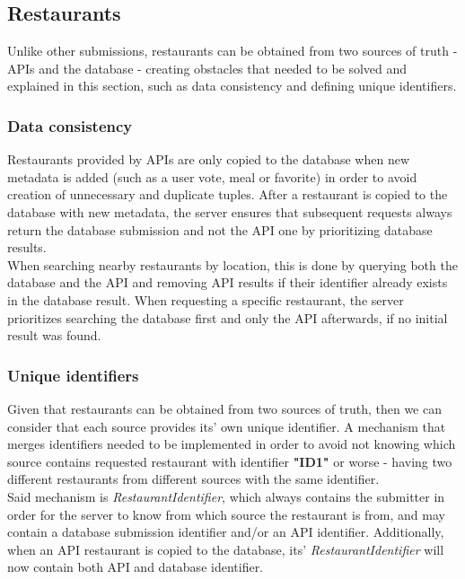 \subsection{Restaurants}

Unlike other submissions, restaurants can be obtained from two sources of truth - APIs and the database -
creating obstacles that needed to be solved and explained in this section, such as data consistency and defining unique identifiers.\\

\subsubsection{Data consistency}

Restaurants provided by APIs are only copied to the database when new metadata is added (such as a user vote, meal or favorite) in order
to avoid creation of unnecessary and duplicate tuples. After a restaurant is copied to the database with new metadata, the server ensures
that subsequent requests always return the database submission and not the API one by prioritizing database results.\\

When searching nearby restaurants by location, this is done by querying both the database and the API and removing API results if their
identifier already exists in the database result. When requesting a specific restaurant, the server prioritizes searching the database
first and only the API afterwards, if no initial result was found.\\

\subsubsection{Unique identifiers}

Given that restaurants can be obtained from two sources of truth, then we can consider that each source provides its' own unique identifier.
A mechanism that merges identifiers needed to be implemented in order to avoid not knowing which source contains requested restaurant with
identifier \textbf{"ID1"} or worse - having two different restaurants from different sources with the same identifier.\\

Said mechanism is \textit{RestaurantIdentifier}, which always contains the submitter in order for the server to know from which source the restaurant
is from, and may contain a database submission identifier and/or an API identifier. Additionally, when an API restaurant is copied to the database,
its' \textit{RestaurantIdentifier} will now contain both API and database identifier.\\

